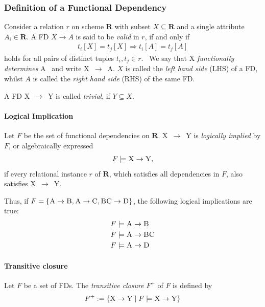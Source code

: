 \subsubsection{Definition of a Functional Dependency}
Consider a relation \(r\) on scheme \(\boldsymbol{R}\) with subset \(X \subseteq \boldsymbol{R}\) and a single attribute \(A_i \in \boldsymbol{R}\).
A FD \(X \to A\) is said to be \emph{valid} in \(r\), if and only if
\begin{align}
    t_i[X] = t_j[X] \Rightarrow t_i[A] = t_j[A] \label{eq:fd-condition}
\end{align}
holds for all pairs of distinct tuples \(t_i,t_j \in r\).~\cite[p.~21]{ABE19}
We say that \textsc{X} \emph{functionally determines} \textsc{A}~\cite[p.~43]{MAI83} and write \textsc{X}~\( \rightarrow \)~\textsc{A}.
\(X\) is called the \emph{left hand side} (LHS) of a FD, whilst \(A\) is called the \emph{right hand side} (RHS) of the same FD.

A FD \textsc{X}~\( \rightarrow \)~\textsc{Y} is called \emph{trivial}, if \( Y \subseteq X \).\cite[p.~163]{STU16}

\paragraph{Logical Implication} Let \( F \) be the set of functional dependencies on \( \boldsymbol{R} \).
\textsc{X}~\( \rightarrow  \)~\textsc{Y} is \emph{logically implied} by \( F \), or algebraically expressed
\begin{align}
    F \models \textsc{X} \rightarrow \textsc{Y},
\end{align}
if every relational instance \( r \) of \( \boldsymbol{R} \), which satisfies all dependencies in \( F \), also satisfies \textsc{X}~\( \rightarrow \)~\textsc{Y}.~\cite[p.~166]{STU16}

Thus, if \( F = \{ \textsc{A} \rightarrow \textsc{B}, \textsc{A} \rightarrow \textsc{C}, \textsc{BC} \rightarrow \textsc{D} \} \), the following logical implications are true:
\begin{align*}
    &F \models \textsc{A} \rightarrow \textsc{B} \\
    &F \models \textsc{A} \rightarrow \textsc{BC} \\
    &F \models \textsc{A} \rightarrow \textsc{D}
\end{align*}

\paragraph{Transitive closure} Let \( F \) be a set of FDs.
The \emph{transitive closure} \( F^{+} \) of \( F \) is defined by
\begin{align}
    F^{+} := \{ \textsc{X} \rightarrow \textsc{Y} \mid F \models \textsc{X} \rightarrow \textsc{Y} \}
\end{align}

